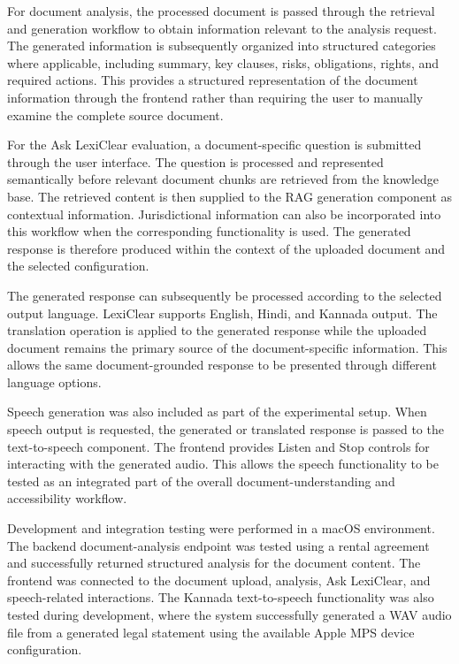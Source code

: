 \documentclass[12pt,a4paper,oneside]{report}
\begin{document}
For document analysis, the processed document is passed through the retrieval
and generation workflow to obtain information relevant to the analysis
request. The generated information is subsequently organized into structured
categories where applicable, including summary, key clauses, risks,
obligations, rights, and required actions. This provides a structured
representation of the document information through the frontend rather than
requiring the user to manually examine the complete source document.

For the Ask LexiClear evaluation, a document-specific question is submitted
through the user interface. The question is processed and represented
semantically before relevant document chunks are retrieved from the
knowledge base. The retrieved content is then supplied to the RAG generation
component as contextual information. Jurisdictional information can also be
incorporated into this workflow when the corresponding functionality is used.
The generated response is therefore produced within the context of the
uploaded document and the selected configuration.

The generated response can subsequently be processed according to the
selected output language. LexiClear supports English, Hindi, and Kannada
output. The translation operation is applied to the generated response while
the uploaded document remains the primary source of the document-specific
information. This allows the same document-grounded response to be presented
through different language options.

Speech generation was also included as part of the experimental setup. When
speech output is requested, the generated or translated response is passed to
the text-to-speech component. The frontend provides Listen and Stop controls
for interacting with the generated audio. This allows the speech functionality
to be tested as an integrated part of the overall document-understanding and
accessibility workflow.

Development and integration testing were performed in a macOS environment.
The backend document-analysis endpoint was tested using a rental agreement and
successfully returned structured analysis for the document content. The
frontend was connected to the document upload, analysis, Ask LexiClear, and
speech-related interactions. The Kannada text-to-speech functionality was
also tested during development, where the system successfully generated a WAV
audio file from a generated legal statement using the available Apple MPS
device configuration.
\end{document}
